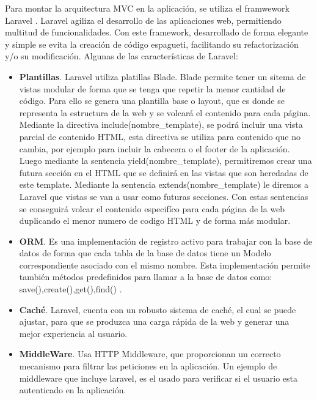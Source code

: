 \vspace{5 mm}

Para montar la arquitectura MVC en la aplicación, se utiliza el framwework Laravel \cite{laravel-doc}. Laravel agiliza el desarrollo de las aplicaciones web, permitiendo multitud de funcionalidades. Con este framework, desarrollado de forma elegante y simple se evita la creación de código espagueti, facilitando su refactorización y/o su modificación. Algunas de las características de Laravel: 


\begin{itemize}

\item \textbf{Plantillas}. Laravel utiliza platillas Blade. Blade permite tener un sitema de vistas modular de forma que se tenga que repetir la menor cantidad de código. Para ello se genera una plantilla base o layout, que es donde se representa la estructura de la web y se volcará el contenido para cada página. Mediante la directiva include(nombre\_template), se podrá incluir una vista parcial de contenido HTML, esta directiva se utiliza para contenido que no cambia, por ejemplo para incluir la cabecera o el footer de la aplicación. Luego mediante la sentencia yield(nombre\_template), permitiremos crear una futura sección en el HTML que se definirá en las vistas que son heredadas de este template. Mediante la sentencia extends(nombre\_template) le diremos a Laravel que vistas se van a usar como futuras secciones. Con estas sentencias se conseguirá volcar el contenido especifíco para cada página de la web duplicando el menor numero de codigo HTML y de forma más modular.

\item \textbf{ORM}. Es una implementación de registro activo para trabajar con la base de datos de forma que cada tabla de la base de datos tiene un Modelo correspondiente asociado con el mismo nombre. Esta implementación permite también métodos predefinidos para llamar a la base de datos como: save(),create(),get(),find() \cite{eloquent-orm}.

\item \textbf{Caché}. Laravel, cuenta con un robusto sistema de caché, el cual se puede ajustar, para que se produzca una carga rápida de la web y generar una mejor experiencia al usuario.

\item \textbf{MiddleWare}. Usa HTTP Middleware, que proporcionan un correcto mecanismo para filtrar las peticiones en la aplicación. Un ejemplo de middleware que incluye laravel, es el usado para verificar si el usuario esta autenticado en la aplicación.

\end{itemize}

